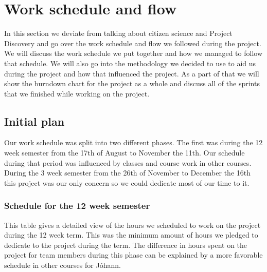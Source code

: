 \section{Work schedule and flow}\label{sec:workscheduleandflow}

In this section we deviate from talking about citizen science and Project Discovery and go over the work schedule and flow we followed during the project. We will discuss the work schedule we put together and how we managed to follow that schedule. We will also go into the methodology we decided to use to aid us during the project and how that influenced the project. As a part of that we will show the burndown chart for the project as a whole and discuss all of the sprints that we finished while working on the project.


\subsection{Initial plan}

Our work schedule was split into two different phases. The first was during the 12 week semester from the 17th of August to November the 11th. Our schedule during that period was influenced by classes and course work in other courses. During the 3 week semester from the 26th of November to December the 16th this project was our only concern so we could dedicate most of our time to it. 

\subsubsection{Schedule for the 12 week semester}
  This table gives a detailed view of the hours we scheduled to work on the project during the 12 week term. This was the minimum amount of hours we pledged to dedicate to the project during the term. The difference in hours spent on the project for team members during this phase can be explained by a more favorable schedule in other courses for Jóhann. 

  \noindent

